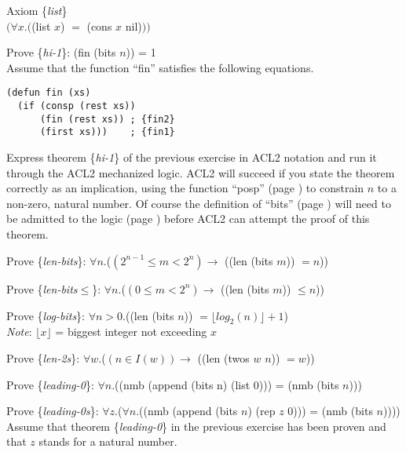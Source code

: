 \begin{ExerciseList}

\label{list-axiom-formal}
\begin{center}
Axiom \{\emph{list}\} \\
$(\forall x.($(list $x$) $=$ (cons $x$ nil)$))$
\end{center}

\Exercise \label{hi-1} Prove \{\emph{hi-1}\}:
(fin (bits $n$)) = 1 \\
Assume that the function ``fin'' satisfies the following equations.
\label{fin-defun}
\begin{Verbatim}
(defun fin (xs)
  (if (consp (rest xs))
      (fin (rest xs)) ; {fin2}
      (first xs)))    ; {fin1}
\end{Verbatim}


\Exercise \label{hi-1-defthm} Express theorem \{\emph{hi-1}\}
of the previous exercise in ACL2 notation
and run it through the ACL2 mechanized logic.
ACL2 will succeed if you state the theorem correctly as an implication,
using the function ``posp'' (page \pageref{posp-def})
to constrain $n$ to a non-zero, natural number.
Of course the definition of ``bits'' (page \pageref{bits-defun})
will need to be admitted to the logic  (page \pageref{admit-def})
before ACL2 can attempt the proof of this theorem.

\Exercise \label{len-bits} Prove \{\emph{len-bits}\}:
$\forall n$.($(2^{n-1} \le m < 2^n) \rightarrow$ ((len (bits $m$)) $= n$))

\Exercise \label{len-bitsLE} Prove \{\emph{len-bits}$\le$\}:
$\forall n$.($(0 \le m < 2^n) \rightarrow$ ((len (bits $m$)) $\le n$))

\Exercise \label{log-bits} Prove \{\emph{log-bits}\}:
$\forall n > 0$.((len (bits $n$)) $= \lfloor log_2(n) \rfloor + 1$) \\
\emph{Note}: $\lfloor x \rfloor$ = biggest integer not exceeding $x$

\Exercise \label{len-2s} Prove \{\emph{len-2s}\}:
$\forall w$.($(n \in I(w)) \rightarrow$ ((len (twos $w$ $n$)) $= w$))

\Exercise \label{leading-0} Prove \{\emph{leading-0}\}:
$\forall n$.((nmb (append (bits n) (list 0))) = (nmb (bits $n$)))

\Exercise \label{leading-0s} Prove \{\emph{leading-0s}\}:
$\forall z$.($\forall n$.((nmb (append (bits $n$) (rep $z$ 0))) = (nmb (bits $n$)))) \\
Assume that theorem \{\emph{leading-0}\} in the previous exercise
has been proven and that $z$ stands for a natural number.


\end{ExerciseList}
